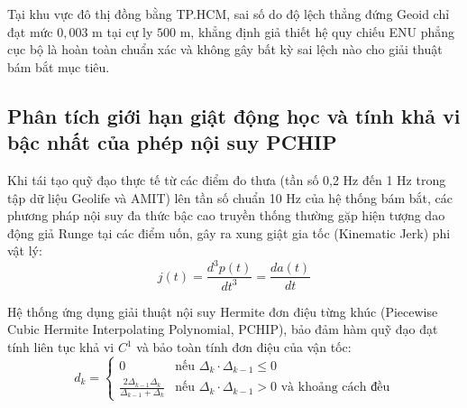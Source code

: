 Tại khu vực đô thị đồng bằng TP.HCM, sai số do độ lệch thẳng đứng Geoid chỉ đạt mức $0{,}003$ m tại cự ly $500$ m, khẳng định giả thiết hệ quy chiếu ENU phẳng cục bộ là hoàn toàn chuẩn xác và không gây bất kỳ sai lệch nào cho giải thuật bám bắt mục tiêu.

\subsection{Phân tích giới hạn giật động học và tính khả vi bậc nhất của phép nội suy PCHIP}

\hspace{0.5cm} Khi tái tạo quỹ đạo thực tế từ các điểm đo thưa (tần số 0,2 Hz đến 1 Hz trong tập dữ liệu Geolife và AMIT) lên tần số chuẩn 10 Hz của hệ thống bám bắt, các phương pháp nội suy đa thức bậc cao truyền thống thường gặp hiện tượng dao động giả Runge tại các điểm uốn, gây ra xung giật gia tốc (Kinematic Jerk) phi vật lý:
\begin{equation}
j(t) = \frac{d^3 p(t)}{dt^3} = \frac{d a(t)}{dt}
\label{eq:jerk-definition-formula}
\end{equation}

Hệ thống ứng dụng giải thuật nội suy Hermite đơn điệu từng khúc (Piecewise Cubic Hermite Interpolating Polynomial, PCHIP), bảo đảm hàm quỹ đạo đạt tính liên tục khả vi $C^1$ và bảo toàn tính đơn điệu của vận tốc:
\begin{equation}
d_k = \begin{cases}
0 & \text{nếu } \Delta_k \cdot \Delta_{k-1} \le 0 \\
\frac{2 \Delta_{k-1} \Delta_k}{\Delta_{k-1} + \Delta_k} & \text{nếu } \Delta_k \cdot \Delta_{k-1} > 0 \text{ và khoảng cách đều}
\end{cases}
\label{eq:pchip-derivative-formula-w14}
\end{equation}

\begin{table}[H]
\centering
\caption{So sánh độ mượt mà động học và xung giật gia tốc giữa các phương pháp nội suy}
\label{tab:pchip-vs-spline-jerk-comparison}
\end{table}

